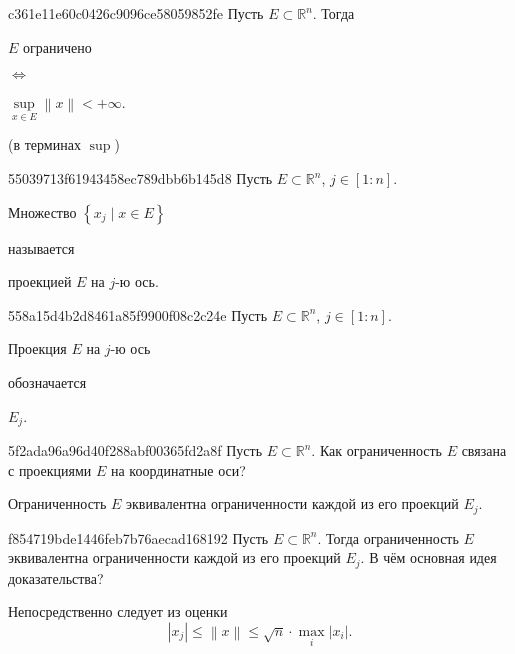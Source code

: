 \begin{note}{c361e11e60c0426c9096ce58059852fe}
    Пусть \({ E \subset \mathbb R^{n} }\). Тогда \begin{icloze}{2}\({ E }\) ограничено\end{icloze} \begin{icloze}{3}\({ \iff }\)\end{icloze} \begin{icloze}{1}\({ \underset{x \in E}{\sup} \left\lVert x \right\rVert < +\infty }\).\end{icloze}

    \begin{center}
        \tiny
        (в терминах \({ \sup }\))
    \end{center}
\end{note}

\begin{note}{55039713f61943458ec789dbb6b145d8}
    Пусть \({ E \subset \mathbb R^{n} }\),\: \({ j \in [1 : n] }\).
    \begin{icloze}{1}Множество \({ \left\{ x_j \mid x \in E \right\} }\)\end{icloze} называется \begin{icloze}{2}проекцией \({ E }\) на \({ j }\)-ю ось.\end{icloze}
\end{note}

\begin{note}{558a15d4b2d8461a85f9900f08c2c24e}
    Пусть \({ E \subset \mathbb R^{n} }\),\: \({ j \in [1 : n] }\).
    \begin{icloze}{1}Проекция \({ E }\) на \({ j }\)-ю ось\end{icloze} обозначается \begin{icloze}{2}\({ E_j }\).\end{icloze}
\end{note}

\begin{note}{5f2ada96a96d40f288abf00365fd2a8f}
    Пусть \({ E \subset \mathbb R^{n} }\).
    Как ограниченность \({ E }\) связана с проекциями \({ E }\) на координатные оси?

    \begin{cloze}{1}
        Ограниченность \({ E }\) эквивалентна ограниченности каждой из его проекций \({ E_j }\).
    \end{cloze}
\end{note}

\begin{note}{f854719bde1446feb7b76aecad168192}
    Пусть \({ E \subset \mathbb R^{n} }\).
    Тогда ограниченность \({ E }\) эквивалентна ограниченности каждой из его проекций \({ E_j }\).
    В чём основная идея доказательства?

    \begin{cloze}{1}
        Непосредственно следует из оценки
        \[
            \left\lvert x_j \right\rvert \leqslant \left\lVert x \right\rVert \leqslant \sqrt{n} \cdot \underset{i}{\max} \left\lvert x_i \right\rvert.
        \]
    \end{cloze}
\end{note}

